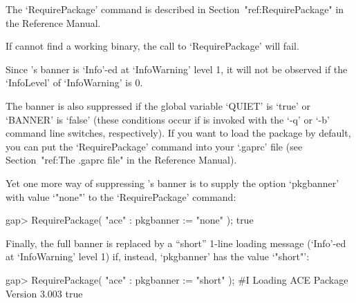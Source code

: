 The      `RequirePackage'      command      is      described       in
Section~"ref:RequirePackage" in the {\GAP} Reference Manual.

If {\GAP} cannot find a working binary, the call  to  `RequirePackage'
will fail.

Since {\ACE}'s banner is `Info'-ed at `InfoWarning' level 1,  it  will
not be observed if the `InfoLevel' of `InfoWarning' is 0.

The banner is also suppressed if the global {\GAP} variable `QUIET' is
`true' or `BANNER' is `false' (these conditions  occur  if  {\GAP}  is
invoked with the `-q' or `-b' command line switches, respectively). If
you want to load the {\ACE}  package  by  default,  you  can  put  the
`RequirePackage' command into your `.gaprc' file (see Section~"ref:The
.gaprc file" in the {\GAP} Reference Manual).

Yet one more way of suppressing  {\ACE}'s  banner  is  to  supply  the
option  `pkgbanner'  with  value  `"none"'  to  the   `RequirePackage'
command:

\beginexample
gap> RequirePackage( "ace" : pkgbanner := "none" );
true
\endexample

Finally, the full banner is replaced by  a  ``short''  1-line  loading
message (`Info'-ed at `InfoWarning' level 1) if, instead,  `pkgbanner'
has the value `"short"':

\begintt
gap> RequirePackage( "ace" : pkgbanner := "short" );
#I  Loading ACE Package Version 3.003
true
\endtt

